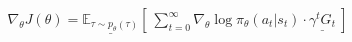 \begin{align}\boxed{
\nabla_\theta J(\theta) = \underline{\mathbb{E}_{\tau \sim p_\theta(\tau)}} \left\lbrack\ \sum_{t=0}^{\infty} \nabla_\theta\log \pi_\theta(a_t|s_t)\cdot \underline{\gamma^t G_t} \ \right\rbrack
}\end{align}